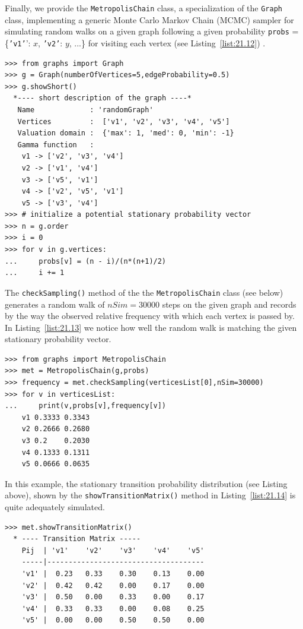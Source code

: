 Finally, we provide the \texttt{MetropolisChain} class, a specialization of the \texttt{Graph} class, implementing a generic \Metropolis Monte Carlo Markov Chain (MCMC) sampler for simulating random walks on a given graph following a given probability \texttt{probs} = \{\texttt{'v1'}’: $x$, \texttt{'v2'}: $y$, ...\} for visiting each vertex (see Listing~\vref{list:21.12})
\citep{MET-1953}.
\begin{lstlisting}[caption={Simulating random walks on a graph},label=list:21.12]
>>> from graphs import Graph
>>> g = Graph(numberOfVertices=5,edgeProbability=0.5)
>>> g.showShort()
  *---- short description of the graph ----*
   Name             : 'randomGraph'
   Vertices         :  ['v1', 'v2', 'v3', 'v4', 'v5']
   Valuation domain :  {'max': 1, 'med': 0, 'min': -1}
   Gamma function   :
    v1 -> ['v2', 'v3', 'v4']
    v2 -> ['v1', 'v4']
    v3 -> ['v5', 'v1']
    v4 -> ['v2', 'v5', 'v1']
    v5 -> ['v3', 'v4']
>>> # initialize a potential stationary probability vector 
>>> n = g.order
>>> i = 0
>>> for v in g.vertices:
...     probs[v] = (n - i)/(n*(n+1)/2)
...     i += 1
\end{lstlisting}

The \texttt{checkSampling()} method  of the the \texttt{MetropolisChain} class (see below) generates a random walk of $nSim = 30000$ steps on the given graph and records by the way the observed relative frequency with which each vertex is passed by. In Listing~\vref{list:21.13} we notice how well the random walk is matching the given stationary probability vector.
\begin{lstlisting}[caption={Checking the quality of the MCMC sampler},label=list:21.13]
>>> from graphs import MetropolisChain     
>>> met = MetropolisChain(g,probs)
>>> frequency = met.checkSampling(verticesList[0],nSim=30000)
>>> for v in verticesList:
...     print(v,probs[v],frequency[v])   
    v1 0.3333 0.3343
    v2 0.2666 0.2680
    v3 0.2    0.2030
    v4 0.1333 0.1311
    v5 0.0666 0.0635
\end{lstlisting}

In this example, the stationary transition probability distribution (see Listing above), shown by the \texttt{showTransitionMatrix()} method in Listing~\vref{list:21.14} is quite adequately simulated.
\begin{lstlisting}[caption={Printing the transition probability distribution},label=list:21.14]
>>> met.showTransitionMatrix()
  * ---- Transition Matrix -----
    Pij  | 'v1'    'v2'    'v3'    'v4'    'v5'
    -----|-------------------------------------
    'v1' |  0.23   0.33    0.30    0.13    0.00
    'v2' |  0.42   0.42    0.00    0.17    0.00
    'v3' |  0.50   0.00    0.33    0.00    0.17
    'v4' |  0.33   0.33    0.00    0.08    0.25
    'v5' |  0.00   0.00    0.50    0.50    0.00
\end{lstlisting}


